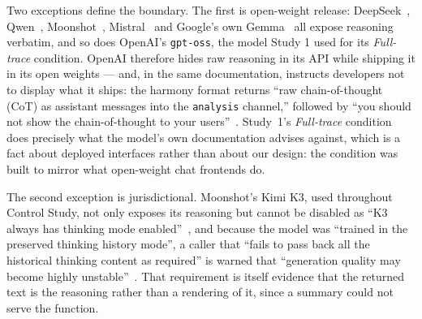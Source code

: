 \documentclass[manuscript,review,anonymous]{acmart}
\begin{document}
Two exceptions define the boundary. 
The first is open-weight release: DeepSeek~\cite{deepseek2025thinking}, Qwen~\cite{alibaba2026deepthinking}, Moonshot~\cite{moonshot2026k3}, Mistral~\cite{mistral2026reasoning} and Google's own Gemma~\cite{google2026gemmathinking} all expose reasoning verbatim,
and so does OpenAI's \texttt{gpt-oss}, the model Study 1 used for its
\textit{Full-trace} condition. OpenAI therefore hides raw reasoning in its API
while shipping it in its open weights --- and, in the same documentation,
instructs developers not to display what it ships: the harmony format returns
``raw chain-of-thought (CoT) as assistant messages into the \texttt{analysis}
channel,'' followed by ``you should not show the chain-of-thought to
your users''~\cite{openai2025harmony}. Study~1's \textit{Full-trace} condition
does precisely what the model's own documentation advises against, which is a
fact about deployed interfaces rather than about our design: the condition was
built to mirror what open-weight chat frontends do.

The second exception is jurisdictional. Moonshot's Kimi K3, used throughout Control Study, not only exposes its reasoning but cannot be disabled as ``K3 always has thinking mode enabled''~\cite{moonshot2026k3}, and because the model was ``trained in the
preserved thinking history mode'', a caller that ``fails to pass back all the
historical thinking content as required'' is warned that ``generation quality
may become highly unstable''~\cite{moonshot2026k3blog}. That requirement is itself evidence that the
returned text is the reasoning rather than a rendering of it, since a summary could not serve the function.
\end{document}
